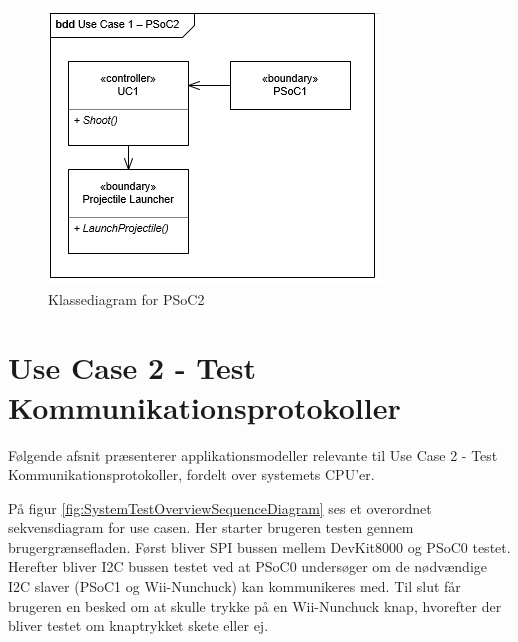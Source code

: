 \begin{figure}[H]
	\centering
	\includegraphics[scale=0.8]{Systemarkitektur/images/klasseUC1PSoC2}
	\caption{Klassediagram for PSoC2}
	\label{fig:klasseUC1PSoC2}
\end{figure}

\newpage
\section{Use Case 2 - Test Kommunikationsprotokoller}

Følgende afsnit præsenterer applikationsmodeller relevante til Use Case 2 - Test Kommunikationsprotokoller, fordelt over systemets CPU'er.

På figur \ref{fig:SystemTestOverviewSequenceDiagram} ses et overordnet sekvensdiagram for use casen. Her starter brugeren testen gennem brugergrænsefladen. Først bliver SPI bussen mellem DevKit8000 og PSoC0 testet. Herefter bliver I2C bussen testet ved at PSoC0 undersøger om de nødvændige I2C slaver (PSoC1 og Wii-Nunchuck) kan kommunikeres med. Til slut får brugeren en besked om at skulle trykke på en Wii-Nunchuck knap, hvorefter der bliver testet om knaptrykket skete eller ej.

